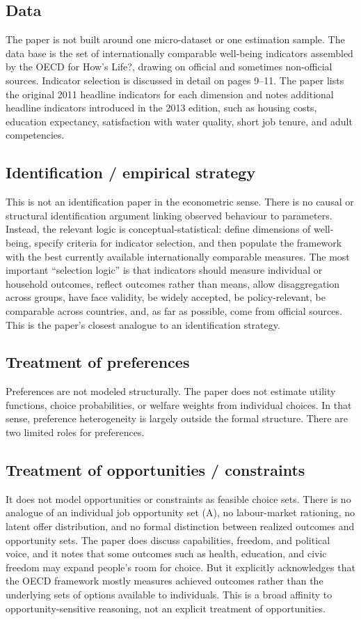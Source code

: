 \documentclass[11pt,a4paper]{article}
\begin{document}
\subsection*{Data}
The paper is not built around one micro-dataset or one estimation sample. The data base is the set of internationally comparable well-being indicators assembled by the OECD for How’s Life?, drawing on official and sometimes non-official sources. Indicator selection is discussed in detail on pages 9–11. The paper lists the original 2011 headline indicators for each dimension and notes additional headline indicators introduced in the 2013 edition, such as housing costs, education expectancy, satisfaction with water quality, short job tenure, and adult competencies.

\subsection*{Identification / empirical strategy}
This is not an identification paper in the econometric sense. There is no causal or structural identification argument linking observed behaviour to parameters. Instead, the relevant logic is conceptual-statistical: define dimensions of well-being, specify criteria for indicator selection, and then populate the framework with the best currently available internationally comparable measures. The most important “selection logic” is that indicators should measure individual or household outcomes, reflect outcomes rather than means, allow disaggregation across groups, have face validity, be widely accepted, be policy-relevant, be comparable across countries, and, as far as possible, come from official sources. This is the paper’s closest analogue to an identification strategy.

\subsection*{Treatment of preferences}
Preferences are not modeled structurally. The paper does not estimate utility functions, choice probabilities, or welfare weights from individual choices. In that sense, preference heterogeneity is largely outside the formal structure. There are two limited roles for preferences.

\subsection*{Treatment of opportunities / constraints}
It does not model opportunities or constraints as feasible choice sets. There is no analogue of an individual job opportunity set (A), no labour-market rationing, no latent offer distribution, and no formal distinction between realized outcomes and opportunity sets. The paper does discuss capabilities, freedom, and political voice, and it notes that some outcomes such as health, education, and civic freedom may expand people’s room for choice. But it explicitly acknowledges that the OECD framework mostly measures achieved outcomes rather than the underlying sets of options available to individuals. This is a broad affinity to opportunity-sensitive reasoning, not an explicit treatment of opportunities.
\end{document}
